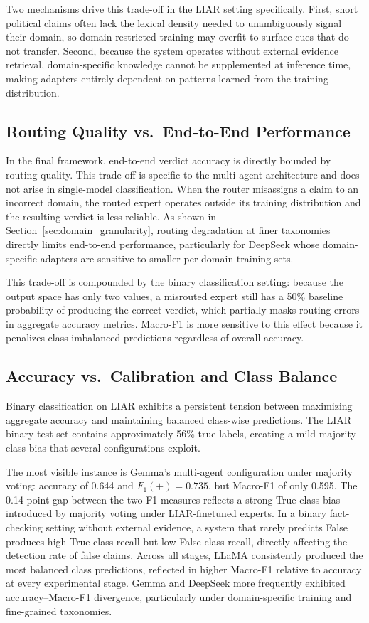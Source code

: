 Two mechanisms drive this trade-off in the LIAR setting specifically. First, short political claims often lack the lexical density needed to unambiguously signal their domain, so domain-restricted training may overfit to surface cues that do not transfer. Second, because the system operates without external evidence retrieval, domain-specific knowledge cannot be supplemented at inference time, making adapters entirely dependent on patterns learned from the training distribution.

\subsection{Routing Quality vs.\ End-to-End Performance}

In the final framework, end-to-end verdict accuracy is directly bounded by routing quality. This trade-off is specific to the multi-agent architecture and does not arise in single-model classification. When the router misassigns a claim to an incorrect domain, the routed expert operates outside its training distribution and the resulting verdict is less reliable. As shown in Section~\ref{sec:domain_granularity}, routing degradation at finer taxonomies directly limits end-to-end performance, particularly for DeepSeek whose domain-specific adapters are sensitive to smaller per-domain training sets.

This trade-off is compounded by the binary classification setting: because the output space has only two values, a misrouted expert still has a 50\% baseline probability of producing the correct verdict, which partially masks routing errors in aggregate accuracy metrics. Macro-F1 is more sensitive to this effect because it penalizes class-imbalanced predictions regardless of overall accuracy.

\subsection{Accuracy vs.\ Calibration and Class Balance}

Binary classification on LIAR exhibits a persistent tension between maximizing aggregate accuracy and maintaining balanced class-wise predictions. The LIAR binary test set contains approximately 56\% true labels, creating a mild majority-class bias that several 
configurations exploit.

The most visible instance is Gemma's multi-agent configuration under majority voting: accuracy of 0.644 and $F_1(+) = 0.735$, but 
Macro-F1 of only 0.595. The 0.14-point gap between the two F1 measures reflects a strong True-class bias introduced by majority 
voting under LIAR-finetuned experts. In a binary fact-checking setting without external evidence, a system that rarely predicts 
False produces high True-class recall but low False-class recall, directly affecting the detection rate of false claims. Across all 
stages, LLaMA consistently produced the most balanced class predictions, reflected in higher Macro-F1 relative to accuracy at 
every experimental stage. Gemma and DeepSeek more frequently exhibited accuracy--Macro-F1 divergence, particularly under 
domain-specific training and fine-grained taxonomies.

